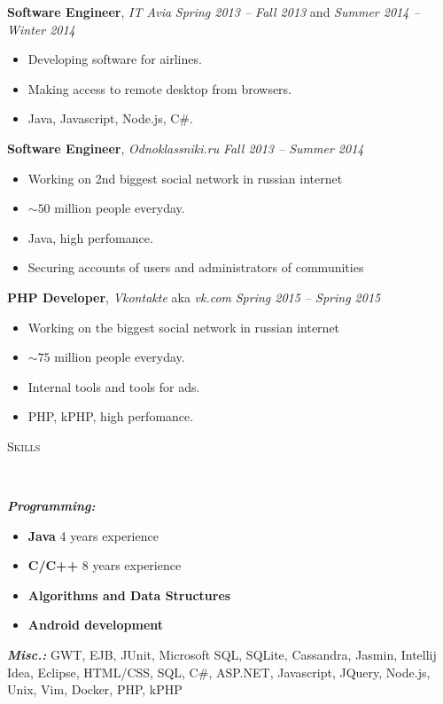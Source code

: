 \documentclass[12pt]{article}
\newenvironment{changemargin}[2]{%
  \begin{list}{}{%
    \setlength{\topsep}{0pt}%
    \setlength{\leftmargin}{#1}%
    \setlength{\rightmargin}{#2}%
    \setlength{\listparindent}{\parindent}%
    \setlength{\itemindent}{\parindent}%
    \setlength{\parsep}{\parskip}%
  }%
  \item[]}{\end{list}
}
\newcommand{\lineover}{
	\begin{changemargin}{-0.05in}{-0.05in}
		\vspace*{-8pt}
		\hrulefill \\
		\vspace*{-2pt}
	\end{changemargin}
}
\newcommand{\header}[1]{
	\begin{changemargin}{-0.5in}{-0.5in}
		\scshape{#1}\\
  	\lineover
	\end{changemargin}
}
\newenvironment{body} {
	\vspace*{-16pt}
	\begin{changemargin}{-0.25in}{-0.5in}
  }	
	{\end{changemargin}
}
\begin{document}
\begin{body}
	\vspace{14pt}
	\textbf{Software Engineer}, \emph{IT Avia} \hfill \emph{Spring 2013 -- Fall 2013} and \emph{Summer 2014 -- Winter 2014}\\
	\vspace*{-4pt}
	\begin{itemize} \itemsep -0pt  %
		\item Developing software for airlines.
		\item Making access to remote desktop from browsers.
		\item Java, Javascript, Node.js, C\#.
	\end{itemize}
	\smallskip
	\vspace{14pt}
	\textbf{Software Engineer}, \emph{Odnoklassniki.ru} \hfill \emph{Fall 2013 -- Summer 2014}\\
	\vspace*{-4pt}
	\begin{itemize} \itemsep -0pt  %
		\item Working on 2nd biggest social network in russian internet
		\item $\sim50$ million people everyday.
		\item Java, high perfomance.
		\item Securing accounts of users and administrators of communities
	\end{itemize}
	\vspace{14pt}
	\textbf{PHP Developer}, \emph{Vkontakte} aka \emph{vk.com} \hfill \emph{Spring 2015 -- Spring 2015}\\
	\vspace*{-4pt}
	\begin{itemize} \itemsep -0pt  %
		\item Working on the biggest social network in russian internet
		\item $\sim75$ million people everyday.
		\item Internal tools and tools for ads.
		\item PHP, kPHP, high perfomance.
	\end{itemize}
\end{body}
\smallskip


\header{Skills}

\begin{body}
	\vspace{14pt}
	\emph{\textbf{Programming:}}{}
	\begin{itemize}
		\item \textbf{Java} 4 years experience
		\item \textbf{C/C++} 8 years experience
		\item \textbf{Algorithms and Data Structures}
		\item \textbf{Android development} 
	\end{itemize}
	\emph{\textbf{Misc.:}}{} GWT, EJB, JUnit, Microsoft SQL, SQLite, Cassandra,
	Jasmin, Intellij Idea, Eclipse, HTML/CSS, SQL, C\#, ASP.NET, Javascript,
	JQuery, Node.js, Unix, Vim, Docker, PHP, kPHP
\end{body}
\end{document}
